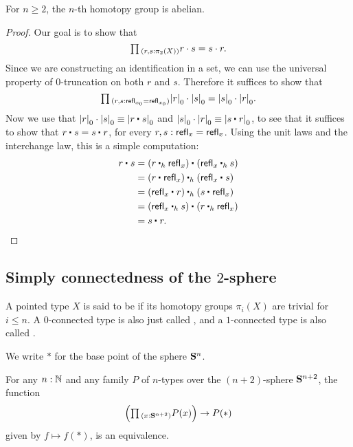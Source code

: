 \begin{thm}
For $n\geq 2$, the $n$-th homotopy group is abelian.
\end{thm}

\begin{proof}
Our goal is to show that 
\begin{equation*}
\prd{r,s:\pi_2(X)} r\cdot s=s\cdot r.
\end{equation*}
Since we are constructing an identification in a set, we can use the universal property of $0$-truncation on both $r$ and $s$. Therefore it suffices to show that
\begin{equation*}
\prd{r,s:\refl{x_0}=\refl{x_0}} \tproj{0}r\cdot \tproj{0}s=\tproj{0}s\cdot \tproj{0}r.
\end{equation*}
Now we use that $\tproj{0}{r}\cdot\tproj{0}{s}\jdeq \tproj{0}{\ct{r}{s}}$ and $\tproj{0}{s}\cdot\tproj{0}{r}\jdeq \tproj{0}{\ct{s}{r}}$, to see that it suffices to show that $\ct{r}{s}=\ct{s}{r}$, for every $r,s:\mathsf{refl}_{x}=\mathsf{refl}_{x}$. Using the unit laws and the interchange law, this is a simple computation:
\begin{align*}
\ct{r}{s} & = \ct{(\ct[h]{r}{\refl{x}})}{(\ct[h]{\refl{x}}{s})} \\
& = \ct[h]{(\ct{r}{\refl{x}})}{(\ct{\refl{x}}{s})} \\
& = \ct[h]{(\ct{\refl{x}}{r})}{(\ct{s}{\refl{x}})} \\
& = \ct{(\ct[h]{\refl{x}}{s})}{(\ct[h]{r}{\refl{x}})} \\
& = \ct{s}{r}.\qedhere
\end{align*}
\end{proof}

\subsection{Simply connectedness of the $2$-sphere}

\begin{defn}
A pointed type $X$ is said to be  if its homotopy groups $\pi_i(X)$ are trivial for $i\leq n$. A $0$-connected type is also just called , and a $1$-connected type is also called . 
\end{defn}

We write $\ast$ for the base point of the sphere $\mathbf{S}^{n}$.

\begin{thm}
For any $n:{\mathbb{N}}$ and any family $P$ of $n$-types over the $(n+2)$-sphere $\mathbf{S}^{n+2}$, the function
\begin{equation*}
\Big(\prd{x:\sphere{n+2}}P(x)\Big)\to P(\ast)
\end{equation*}
given by $f\mapsto f(\ast)$, is an equivalence.
\end{thm}

